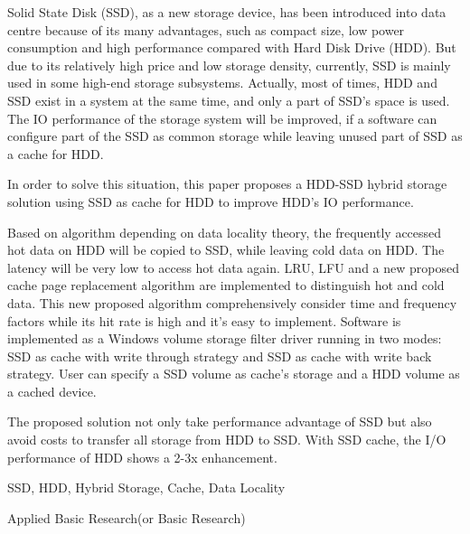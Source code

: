 \begin{eabstract}

Solid State Disk (SSD), as a new storage device, has been introduced into data centre because of its many advantages, such as compact size, low power consumption and high performance compared with Hard Disk Drive (HDD). But due to its relatively high price and low storage density, currently, SSD is mainly used in some high-end storage subsystems. Actually, most of times, HDD and SSD exist in a system at the same time, and only a part of SSD's space is used. The IO performance of the storage system will be improved, if a software can configure part of the SSD as common storage while leaving unused part of SSD as a cache for HDD.

In order to solve this situation, this paper proposes a HDD-SSD hybrid storage solution using SSD as cache for HDD to improve HDD's IO performance.

Based on algorithm depending on data locality theory, the frequently accessed hot data on HDD will be copied to SSD, while leaving cold data on HDD. The latency will be very low to access hot data again. LRU, LFU and a new proposed cache page replacement algorithm are implemented to distinguish hot and cold data. This new proposed algorithm comprehensively consider time and frequency factors while its hit rate is high and it's easy to implement. Software is implemented as a Windows volume storage filter driver running in two modes: SSD as cache with write through strategy and SSD as cache with write back strategy. User can specify a SSD volume as cache's storage and a HDD volume as a cached device.  

The proposed solution not only take performance advantage of SSD but also avoid costs to transfer all storage from HDD to SSD. With SSD cache, the I/O performance of HDD shows a 2-3x enhancement.

\end{eabstract}

\begin{ekeywords}
SSD, HDD, Hybrid Storage, Cache, Data Locality
\end{ekeywords}

\begin{ethesistype}
Applied Basic Research(or Basic Research)
\end{ethesistype}

